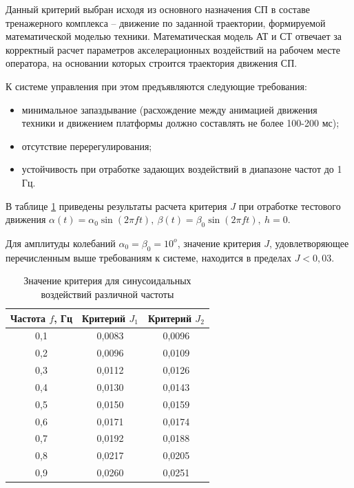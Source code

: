 Данный критерий выбран исходя из основного назначения СП в составе тренажерного комплекса -- движение по заданной траектории, формируемой математической моделью техники. Математическая модель АТ и СТ отвечает за корректный расчет параметров акселерационных воздействий на рабочем месте оператора, на основании которых строится траектория движения СП.

К системе управления при этом предъявляются следующие требования:
\begin{itemize}
	\item минимальное запаздывание (расхождение между анимацией движения техники и движением платформы должно составлять не более 100-200 мс);
	\item отсутствие перерегулирования;
	\item устойчивость при отработке задающих воздействий в диапазоне частот до 1 Гц.
\end{itemize}

В таблице \ref{tbl:KriteriaFreqTable} приведены результаты расчета критерия $J$ при отработке тестового движения $\alpha(t) = \alpha _0\sin(2\pi ft),~\beta(t) = \beta _0\sin(2\pi ft),~h=0$.

Для амплитуды колебаний  $\alpha _0 = \beta _0 = 10^o$, значение критерия $J$, удовлетворяющее перечисленным выше требованиям к системе, находится в пределах $J < 0,03$.

\begin{table} [htbp]%
    \centering
	\caption{Значение критерия для синусоидальных воздействий различной частоты}%
	\label{tbl:KriteriaFreqTable}
	\begin{tabular}{|c||c||c|}
        \hline     %
    	Частота $f$, Гц	& Критерий $J_1$ & Критерий $J_2$\\
        \hline
    	0,1 &	0,0083 &	0,0096 \\
		0,2 &	0,0096 &	0,0109 \\
		0,3 &	0,0112 &	0,0126 \\
		0,4 &	0,0130 &	0,0143 \\
		0,5 &	0,0150 &	0,0159 \\
		0,6 &	0,0171 &	0,0174 \\
		0,7 &	0,0192 &	0,0188 \\
		0,8 &	0,0217 &	0,0205 \\
		0,9 &	0,0260 &	0,0251 \\
        \hline
	\end{tabular}%
\end{table}

